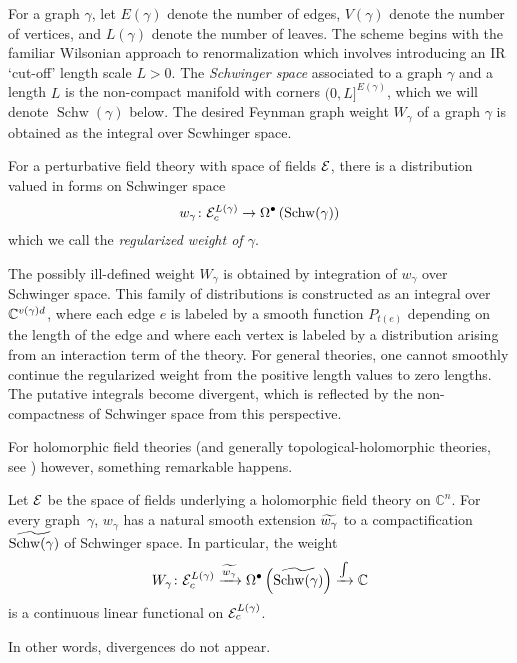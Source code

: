 \documentclass[11pt]{amsart}
\def\til{\Tilde}
\def\C{{\mathbb{C}}}
\renewcommand{\op}{\operatorname}
\def\owen#1{{\textcolor{violet!50!black}{OG: {#1}}}}
\begin{document}
For a graph $\gamma$, let $E(\gamma)$ denote the number of edges,
$V(\gamma)$ denote the number of vertices,
and $L(\gamma)$ denote the number of leaves.
The scheme begins with the familiar Wilsonian approach to renormalization which involves introducing an IR `cut-off' length scale $L > 0$.
The \textit{Schwinger space} associated to a graph $\gamma$ and a length $L$ is the non-compact manifold with corners $(0,L]^{E(\gamma)}$, which we will denote $\op{Schw}(\gamma)$ below.
The desired Feynman graph weight $W_\gamma$ of a graph $\gamma$ is obtained as the integral over  Scwhinger space. 

\begin{dfn}
For a perturbative field theory with space of fields $\mathcal E$, there is a distribution valued in forms on Schwinger space
\[
w_{\gamma} \colon \cE^{L(\gamma)}_c \to \Omega^\bu \left( \op{Schw}(\gamma) \right)
\]
which we call the {\em regularized weight of $\gamma$}.
\end{dfn}

The possibly ill-defined weight $W_\gamma$ is obtained by integration of $w_\gamma$ over Schwinger space.
This family of distributions is constructed as an integral over $\mathbb C^{v(\gamma) d}$,
where each edge $e$ is labeled by a smooth function $P_{t(e)}$ depending on the length of the edge and where each vertex is labeled by a distribution arising from an interaction term of the theory.
For general theories, one cannot smoothly continue the regularized weight from the positive length values to zero lengths.
The putative integrals become divergent, which is reflected by the non-compactness of Schwinger space from this perspective.

For holomorphic field theories (and generally topological-holomorphic theories, see \cite{WWthf}) however, something remarkable happens.

\begin{thm}[Wang, \owen{precise citations}]
Let $\mathcal E$ be the space of fields underlying a holomorphic field theory on $\C^n$.
For every graph~$\gamma$, $w_{\gamma}$ has a natural smooth extension $\til {w_\gamma}$ to a compactification $\til{\op{Schw}(\gamma)}$ of Schwinger space.
In particular, the weight
\[
W_\gamma \colon \cE^{L(\gamma)}_c \xto{\til{w_\gamma}}\Omega^\bu \left( \til{\op{Schw}(\gamma)} \right) \xto{\int} \C
\]
is a continuous linear functional on $\mathcal E_c^{L(\gamma)}$.
\end{thm}

In other words, divergences do not appear.
\end{document}
